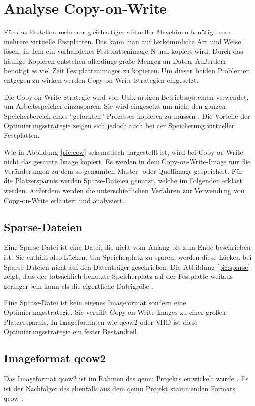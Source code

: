 \chapter{Analyse Copy-on-Write}
Für das Erstellen mehrerer gleichartiger virtueller Maschinen benötigt man mehrere virtuelle Festplatten. Das kann man auf herkömmliche Art und Weise lösen, in dem ein vorhandenes Festplattenimage N mal kopiert wird. Durch das häufige Kopieren entstehen allerdings große Mengen an Daten. Außerdem benötigt es viel Zeit Festplattenimages zu kopieren. Um diesen beiden Problemen entgegen zu wirken werden Copy-on-Write-Strategien eingesetzt.

Die Copy-on-Write-Strategie wird von Unix-artigen Betriebssystemen verwendet, um Arbeitsspeicher einzusparen. Sie wird eingesetzt um nicht den ganzen Speicherbereich eines ``geforkten'' Prozesses kopieren zu müssen \cite{linuxcow}. Die Vorteile der Optimierungsstrategie zeigen sich jedoch auch bei der Speicherung virtueller Festplatten.

Wie in Abbildung \ref{pic:cow} schematisch dargestellt ist, wird bei Copy-on-Write nicht das gesamte Image kopiert. Es werden in dem Copy-on-Write-Image nur die Veränderungen zu dem so genannten Master- oder Quellimage gespeichert. Für die Platzersparnis werden Sparse-Dateien genutzt, welche im Folgenden erklärt werden. Außerdem werden die unterschiedlichen Verfahren zur Verwendung von Copy-on-Write erläutert und analysiert.

\section{Sparse-Dateien}
Eine Sparse-Datei ist eine Datei, die nicht vom Anfang bis zum Ende beschrieben ist. Sie enthält also Lücken. Um Speicherplatz zu sparen, werden diese Lücken bei Sparse-Dateien nicht auf den Datenträger geschrieben. Die Abbildung \ref{pic:sparse} zeigt, dass der tatsächlich benutzte Speicherplatz auf der Festplatte weitaus geringer sein kann als die eigentliche Dateigröße \cite{Sparse}.


Eine Sparse-Datei ist kein eigenes Imageformat sondern eine Optimierungsstrategie. Sie verhilft Copy-on-Write-Images zu einer großen Platzersparnis. In Imageformaten wie qcow2 oder VHD ist diese Optimierungsstrategie ein fester Bestandteil. 

\section{Imageformat qcow2}
Das Imageformat qcow2 ist im Rahmen des qemu Projekts entwickelt wurde \cite{qemuwiki}. Es ist der Nachfolger des ebenfalls aus dem qemu Projekt stammenden Formats qcow \cite{qcowmarkmc}.  

